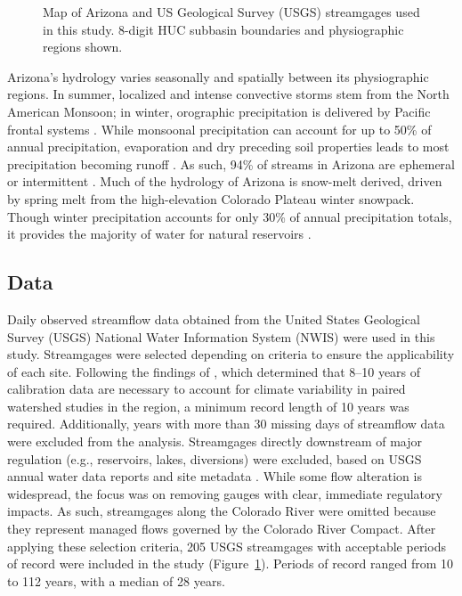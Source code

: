 \documentclass[
  authoryear,
  preprint,
  1p,
  onecolumn]{elsarticle}
\begin{document}
\begin{figure}


\caption{\label{fig-study-area}Map of Arizona and US Geological Survey
(USGS) streamgages used in this study. 8-digit HUC subbasin boundaries
and physiographic regions shown.}

\end{figure}%

Arizona's hydrology varies seasonally and spatially between its
physiographic regions. In summer, localized and intense convective
storms stem from the North American Monsoon; in winter, orographic
precipitation is delivered by Pacific frontal systems
\citep{eastoe2019mtnblock}. While monsoonal precipitation can account
for up to 50\% of annual precipitation, evaporation and dry preceding
soil properties leads to most precipitation becoming runoff
\citep{sheppard2002}. As such, 94\% of streams in Arizona are ephemeral
or intermittent \citep{epa_AZephemeral}. Much of the hydrology of
Arizona is snow-melt derived, driven by spring melt from the
high-elevation Colorado Plateau winter snowpack. Though winter
precipitation accounts for only 30\% of annual precipitation totals, it
provides the majority of water for natural reservoirs
\citep{sheppard2002}.

\subsection{Data}\label{sec-data}

Daily observed streamflow data obtained from the United States
Geological Survey (USGS) National Water Information System (NWIS) were
used in this study. Streamgages were selected depending on criteria to
ensure the applicability of each site. Following the findings of
\citet{odonnell2016}, which determined that 8--10 years of calibration
data are necessary to account for climate variability in paired
watershed studies in the region, a minimum record length of 10 years was
required. Additionally, years with more than 30 missing days of
streamflow data were excluded from the analysis. Streamgages directly
downstream of major regulation (e.g., reservoirs, lakes, diversions)
were excluded, based on USGS annual water data reports and site metadata
\citep{usgs2010}. While some flow alteration is widespread, the focus
was on removing gauges with clear, immediate regulatory impacts. As
such, streamgages along the Colorado River were omitted because they
represent managed flows governed by the Colorado River Compact. After
applying these selection criteria, 205 USGS streamgages with acceptable
periods of record were included in the study
(Figure~\ref{fig-study-area}). Periods of record ranged from 10 to 112
years, with a median of 28 years.
\end{document}
